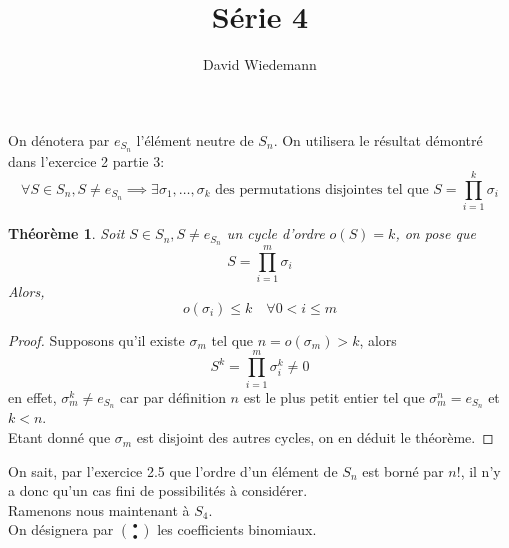\documentclass[11pt, a4paper]{article}
\newtheorem{theorem}{Théorème}
\begin{document}
\title{Série 4}
\author{David Wiedemann}
\maketitle
On dénotera par $e_{S_n} $ l'élément neutre de $S_n$.
On utilisera le résultat démontré dans l'exercice 2 partie 3:
\[ 
	\forall S \in S_n, S \neq e_{S_n}  \implies \exists \sigma_1,\ldots,\sigma_k \text{ des permutations disjointes tel que } S = \prod_{i=1} ^{k} \sigma_i
\]

\begin{theorem}
	Soit $S \in S_n, S \neq e_{S_n} $ un cycle d'ordre $o(S)=k$, on pose que
	\[
		S = \prod_{i=1} ^{m} \sigma_i
	\]
	Alors,
	\[ 
		o(\sigma_i) \leq k \quad \forall 0< i \leq m
	\]
\end{theorem}
\begin{proof}
	Supposons qu'il existe $\sigma_m$ tel que $n=o(\sigma_m) > k$, alors
	 \[ 
	S^{k}= \prod_{i=1} ^{m} \sigma_i^{k} \neq 0
	\]
	en effet, $\sigma_m^{k} \neq e_{S_n}$ car par définition $n$ est le plus petit entier tel que $\sigma_m^{n}=e_{S_n}$ et $k<n$.\\
	Etant donné que $\sigma_m$ est disjoint des autres cycles, on en déduit le théorème.
\end{proof}
On sait, par l'exercice 2.5 que l'ordre d'un élément de $S_n$ est borné par $n!$, il n'y a donc qu'un cas fini de possibilités à considérer.\\
Ramenons nous maintenant à $S_4$.\\
On désignera par $\binom{\bullet}{\bullet}$ les coefficients binomiaux.
\end{document}
